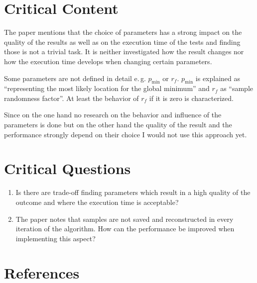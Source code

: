 \documentclass[oneside, notitlepage, twocolumn]{scrartcl}
\newcommand{\eg}{e.\,g.\xspace}
\begin{document}
\section{Critical Content}
The paper mentions that the choice of parameters has a strong impact on the quality of the results as well as on the execution time of the tests and finding those is not a trivial task.
It is neither investigated how the result changes nor how the execution time develops when changing certain parameters.\par
Some parameters are not defined in detail \eg{} \(p_\min\) or \(r_f\).
\(p_\min\) is explained as ``representing the most likely location for the global minimum'' and \(r_f\) as ``sample randomness factor''.
At least the behavior of \(r_f\) if it is zero is characterized.\par
Since on the one hand no research on the behavior and influence of the parameters is done but on the other hand the quality of the result and the performance strongly depend on their choice I would not use this approach yet.

\section{Critical Questions}
\begin{enumerate}
    \item Is there are trade-off finding parameters which result in a high quality of the outcome and where the execution time is acceptable?
    \item The paper notes that samples are not saved and reconstructed in every iteration of the algorithm.
        How can the performance be improved when implementing this aspect?
\end{enumerate}

\printglossary[type=\acronymtype, title=List of Abbreviations]

\section{References}
\begingroup
\renewcommand{\section}[2]{}%
\nocite{*}
\printbibliography%
\endgroup
\end{document}
